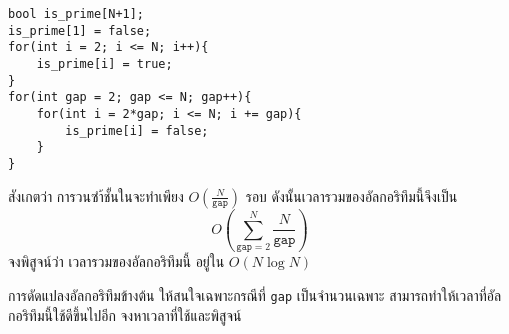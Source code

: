 \begin{lstlisting}
bool is_prime[N+1];
is_prime[1] = false;
for(int i = 2; i <= N; i++){
    is_prime[i] = true;
}
for(int gap = 2; gap <= N; gap++){
    for(int i = 2*gap; i <= N; i += gap){
        is_prime[i] = false;
    }
}
\end{lstlisting}

\begin{exercise}
สังเกตว่า การวนซำ้ชั้นในจะทำเพียง $O\left(\frac{N}{\texttt{gap}}\right)$ รอบ ดังนั้นเวลารวมของอัลกอริทึมนี้จึงเป็น
\[
O\left(\sum_{\texttt{gap}=2}^N \frac{N}{\texttt{gap}}\right)
\]
จงพิสูจน์ว่า เวลารวมของอัลกอริทึมนี้ อยู่ใน $O(N \log N)$
\end{exercise}

\begin{bonus}
การดัดแปลงอัลกอริทึมข้างต้น ให้สนใจเฉพาะกรณีที่ \texttt{gap} เป็นจำนวนเฉพาะ สามารถทำให้เวลาที่อัลกอริทึมนี้ใช้ดีขึ้นไปอีก จงหาเวลาที่ใช้และพิสูจน์
\end{bonus}